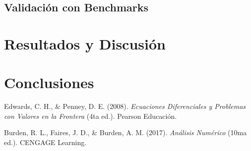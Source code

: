 \documentclass[a4paper,10pt,twocolumn]{article}
\begin{document}
\subsection{Validación con Benchmarks}\label{subsec:validacion}



\section{Resultados y Discusión}\label{sec:resultados}



\section{Conclusiones}\label{sec:conclusiones}




\begin{thebibliography}{99}

Edwards, C. H., \& Penney, D. E. (2008).
\textit{Ecuaciones Diferenciales y Problemas con Valores en la Frontera} (4ta ed.).
Pearson Educación.

Burden, R. L., Faires, J. D., \& Burden, A. M. (2017).
\textit{Análisis Numérico} (10ma ed.).
CENGAGE Learning.


\end{thebibliography}


\label{end}
\end{document}
